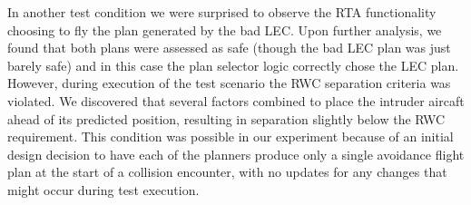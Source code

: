 In another test condition we were surprised to observe the RTA functionality choosing to fly the plan generated by the bad LEC.  Upon further analysis, we found that both plans were assessed as safe (though the bad LEC plan was just barely safe) and in this case the plan selector logic correctly chose the LEC plan.  However, during execution of the test scenario the RWC separation criteria was violated.  We discovered that several factors combined to place the intruder aircaft ahead of its predicted position, resulting in separation slightly below the RWC requirement.  This condition was possible in our experiment because of an initial design decision to have each of the planners produce only a single avoidance flight plan at the start of a collision encounter, with no updates for any changes that might occur during test execution.  


